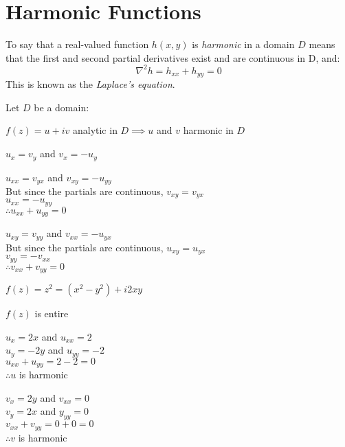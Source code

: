 \documentclass[letterpaper,12pt,fleqn]{article}
\newcommand{\n}{\nabla}
\renewcommand{\n}{\nabla}
\begin{document}
\section*{Harmonic Functions}

\begin{definition}
  To say that a real-valued function $h(x,y)$ is \emph{harmonic} in a domain
  $D$ means that the first and second partial derivatives exist and are
  continuous in D, and:
  \[\n^2h=h_{xx}+h_{yy}=0\]
  This is known as the \emph{Laplace's equation}.
\end{definition}

\begin{theorem}
  Let $D$ be a domain:

  $f(z)=u+iv$ analytic in $D\implies u$ and $v$ harmonic in $D$
\end{theorem}

\begin{theproof}
  $u_x=v_y$ and $v_x=-u_y$

  $u_{xx}=v_{yx}$ and $v_{xy}=-u_{yy}$ \\
  But since the partials are continuous, $v_{xy}=v_{yx}$ \\
  $u_{xx}=-u_{yy}$ \\
  $\therefore u_{xx}+u_{yy}=0$

  $u_{xy}=v_{yy}$ and $v_{xx}=-u_{yx}$ \\
  But since the partials are continuous, $u_{xy}=u_{yx}$ \\
  $v_{yy}=-v_{xx}$ \\
  $\therefore v_{xx}+v_{yy}=0$
\end{theproof}

\begin{example}
  $f(z)=z^2=(x^2-y^2)+i2xy$

  $f(z)$ is entire
  
  $u_x=2x$ and $u_{xx}=2$ \\
  $u_y=-2y$ and $u_{yy}=-2$ \\
  $u_{xx}+u_{yy}=2-2=0$ \\
  $\therefore u$ is harmonic

  $v_x=2y$ and $v_{xx}=0$ \\
  $v_y=2x$ and $y_{yy}=0$ \\
  $v_{xx}+v_{yy}=0+0=0$ \\
  $\therefore v$ is harmonic
\end{example}
\end{document}
